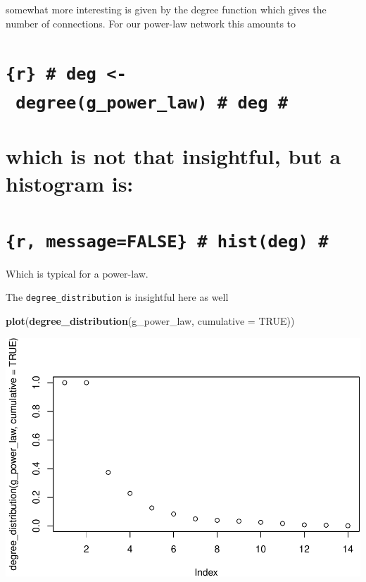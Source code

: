 \documentclass[]{article}
\newenvironment{Shaded}{\begin{snugshade}}{\end{snugshade}}
\newcommand{\KeywordTok}[1]{\textcolor[rgb]{0.13,0.29,0.53}{\textbf{#1}}}
\newcommand{\DataTypeTok}[1]{\textcolor[rgb]{0.13,0.29,0.53}{#1}}
\newcommand{\OtherTok}[1]{\textcolor[rgb]{0.56,0.35,0.01}{#1}}
\newcommand{\NormalTok}[1]{#1}
\theoremstyle{definition}
\theoremstyle{definition}
\theoremstyle{definition}
\theoremstyle{remark}
\begin{document}
somewhat more interesting is given by the degree function which gives
the number of connections. For our power-law network this amounts to

\section{\texorpdfstring{\texttt{\{r\}\ \#\ deg\ \textless{}-\ degree(g\_power\_law)\ \#\ deg\ \#}}{\{r\} \# deg \textless{}- degree(g\_power\_law) \# deg \#}}\label{r-deg---degreeg_power_law-deg}

\section{}\label{section-3}

\section{which is not that insightful, but a histogram
is:}\label{which-is-not-that-insightful-but-a-histogram-is}

\section{}\label{section-4}

\section{\texorpdfstring{\texttt{\{r,\ message=FALSE\}\ \#\ hist(deg)\ \#}}{\{r, message=FALSE\} \# hist(deg) \#}}\label{r-messagefalse-histdeg}

Which is typical for a power-law.

The \texttt{degree\_distribution} is insightful here as well

\begin{Shaded}
\begin{Highlighting}[]
\KeywordTok{plot}\NormalTok{(}\KeywordTok{degree_distribution}\NormalTok{(g_power_law, }\DataTypeTok{cumulative =} \OtherTok{TRUE}\NormalTok{))}
\end{Highlighting}
\end{Shaded}

\includegraphics{ResearchTools_files/figure-latex/unnamed-chunk-59-1.pdf}
\end{document}
